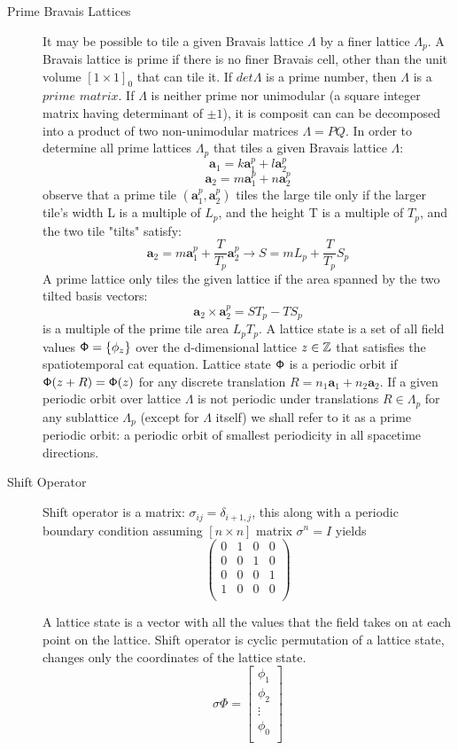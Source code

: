 \begin{description}
\begin{description}
\item[Prime Bravais Lattices]

It may be possible to tile a given Bravais lattice $\Lambda$ by a finer lattice $\Lambda_p$. A Bravais lattice is prime if there is no finer Bravais cell, other than the unit volume $[1\times 1]_0$ that can tile it. If $det \Lambda$ is a prime number, then $\Lambda$ is a $\textit{prime matrix}$. If $\Lambda$ is neither prime nor unimodular (a square integer matrix having determinant of $\pm 1$), it is composit can can be decomposed into a product of two non-unimodular matrices $\Lambda=PQ$. In order to determine all prime lattices $\Lambda_p$ that tiles a given Bravais lattice $\Lambda$:
$$\mathbf{a}_1=k\mathbf{a}_1^p+l\mathbf{a}_2^p$$
$$\mathbf{a}_2=m\mathbf{a}_1^p+n\mathbf{a}_2^p$$
observe that a prime tile $(\mathbf{a}_1^p,\mathbf{a}_2^p)$ tiles the large tile only if the larger tile's width L is a multiple of $L_p$, and the height T is a multiple of $T_p$, and the two tile "tilts" satisfy:
$$\mathbf{a}_2=m\mathbf{a}_1^p+\frac{T}{T_p}\mathbf{a}_2^p \to S=mL_p+\frac{T}{T_p}S_p $$
A prime lattice only tiles the given lattice if the area spanned by the two tilted basis vectors:
$$\mathbf{a}_2\times \mathbf{a}_2^p=ST_p-TS_p$$
is a multiple of the prime tile area $L_p T_p$. A lattice state is a set
of all field values $\mathsf{\Phi}=\{\phi_z\}$ over the d-dimensional lattice
$z\in\mathbb{Z}$ that satisfies the spatiotemporal cat equation. Lattice
state $\mathsf{\Phi}$ is a periodic orbit if $\mathsf{\Phi}(z+R)=\mathsf{\Phi}(z)$ for any discrete
translation $R=n_1\mathbf{a}_1+n_2\mathbf{a}_2$. If a given periodic
orbit over lattice $\Lambda$ is not periodic under translations
$R\in\Lambda_p$ for any sublattice $\Lambda_p$ (except for $\Lambda$
itself) we shall refer to it as a prime periodic orbit: a periodic orbit
of smallest periodicity in all spacetime directions.

\item[Shift Operator]

Shift operator is a matrix: $\sigma_{ij}=\delta_{i+1,j}$, this along with a periodic boundary condition assuming $[n\times n]$ matrix $\sigma^n=I$ yields
$$\left( \begin{array}{cccc}
0&1&0&0\\
0&0&1&0\\
0&0&0&1\\
1&0&0&0\\
\end{array}\right)$$

A lattice state is a vector with all the values that the field takes on at each point on the lattice. Shift operator is cyclic permutation of a lattice state, changes only the coordinates of the lattice state.
$$\sigma\Phi=\left[ \begin{array}{c}
\phi_1\\
\phi_2\\
\vdots\\
\phi_0\\
\end{array}
\right]$$


\end{description}
\end{description}
